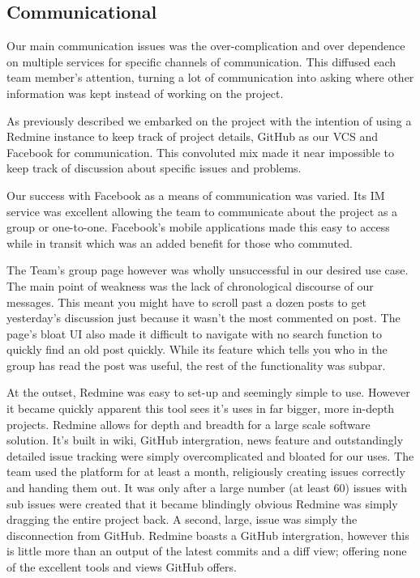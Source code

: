 \documentclass{l3proj}
\begin{document}
\subsection{Communicational}
Our main communication issues was the over-complication and over dependence on multiple services for specific channels of communication. This diffused each team member's attention, turning a lot of communication into asking where other information was kept instead of working on the project.

As previously described we embarked on the project with the intention of using a Redmine instance to keep track of project details, GitHub as our VCS and Facebook for communication. This convoluted mix made it near impossible to keep track of discussion about specific issues and problems.

Our success with Facebook as a means of communication was varied. Its IM service was excellent allowing the team to communicate about the project as a group or one-to-one. Facebook's mobile applications made this easy to access while in transit which was an added benefit for those who commuted.

The Team's group page however was wholly unsuccessful in our desired use case. The main point of weakness was the lack of chronological discourse of our messages. This meant you might have to scroll past a dozen posts to get yesterday's discussion just because it wasn't the most commented on post. The page's bloat UI also made it difficult to navigate with no search function to quickly find an old post quickly. While its feature which tells you who in the group has read the post was useful, the rest of the functionality was subpar.

At the outset, Redmine was easy to set-up and seemingly simple to use. However it became quickly apparent this tool sees it's uses in far bigger, more in-depth projects.
Redmine allows for depth and breadth for a large scale software solution. It's built in wiki, GitHub intergration, news feature and outstandingly detailed issue tracking were simply overcomplicated and bloated for our uses.
The team used the platform for at least a month, religiously creating issues correctly and handing them out. It was only after a large number (at least 60) issues with sub issues were created that it became blindingly obvious Redmine was simply dragging the entire project back.
A second, large, issue was simply the disconnection from GitHub. Redmine boasts a GitHub intergration, however this is little more than an output of the latest commits and a diff view; offering none of the excellent tools and views GitHub offers.
\end{document}
